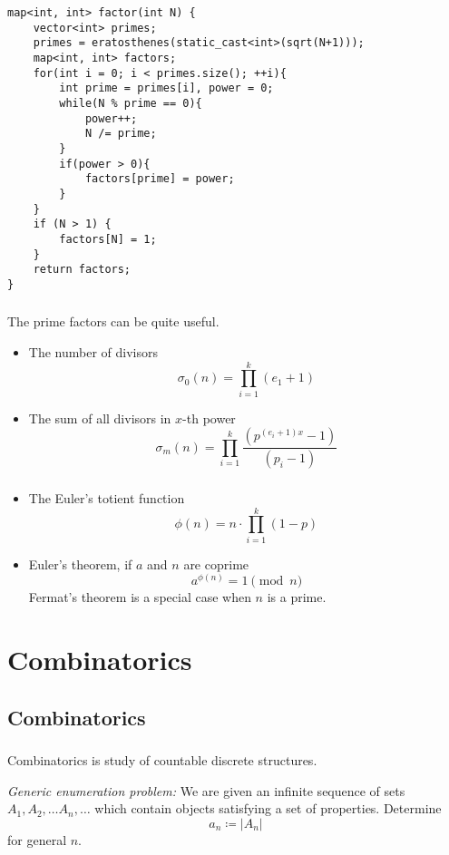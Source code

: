 \documentclass[10pt]{beamer}
\newcommand{\bi}{\begin{itemize}}
\newcommand{\ei}{\end{itemize}}
\begin{document}
\begin{frame}[fragile]
    \begin{verbatim}
map<int, int> factor(int N) {
    vector<int> primes;
    primes = eratosthenes(static_cast<int>(sqrt(N+1)));
    map<int, int> factors;
    for(int i = 0; i < primes.size(); ++i){
        int prime = primes[i], power = 0;
        while(N % prime == 0){
            power++;
            N /= prime;
        }
        if(power > 0){
            factors[prime] = power;
        }
    }
    if (N > 1) {
        factors[N] = 1;
    }
    return factors;
}
  \end{verbatim}
\end{frame}

\begin{frame}
  \frametitle{\insertsubsection}
  \vspace{20pt}
  The prime factors can be quite useful.
  \bi
    \item The number of divisors
    \[
      \sigma_0(n) = \prod_{i=1}^k (e_1 + 1)
    \]
    \item The sum of all divisors in $x$-th power
    \[
      \sigma_m(n) = \prod_{i=1}^k \frac{(p^{(e_i + 1)x} - 1)}{(p_i-1)}
    \]
  \ei
\end{frame}

\begin{frame}
  \frametitle{\insertsubsection}
  \vspace{20pt}
  \bi
    \item The Euler's totient function
      \[
        \phi(n) = n \cdot \prod_{i=1}^{k} (1 - p)
      \]
    \item Euler's theorem, if $a$ and $n$ are coprime
      \[
        a^{\phi(n)} = 1 \pmod{n}
      \]
      Fermat's theorem is a special case when $n$ is a prime.
  \ei
\end{frame}


\section{Combinatorics}
\subsection{Combinatorics}
\begin{frame}
  \frametitle{\insertsubsection}
  \vspace{30pt}
  Combinatorics is study of countable discrete structures.

  \vspace{10pt}
  \emph{Generic enumeration problem: } We are given an infinite sequence of
  sets $A_1, A_2, \ldots A_n, \ldots$ which contain objects satisfying a set of
  properties. Determine 
  \[
    a_n \coloneqq \lvert A_n \rvert
  \]
  for general $n$.
\end{frame}
\end{document}
